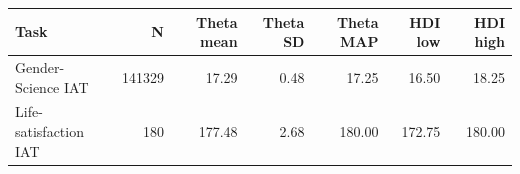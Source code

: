 \begin{tabular}{lrrrrrr}
\toprule
Task & N & Theta mean & Theta SD & Theta MAP & HDI low & HDI high \\
\midrule
Gender-Science IAT & 141329 & 17.29 & 0.48 & 17.25 & 16.50 & 18.25 \\
Life-satisfaction IAT & 180 & 177.48 & 2.68 & 180.00 & 172.75 & 180.00 \\
\bottomrule
\end{tabular}
